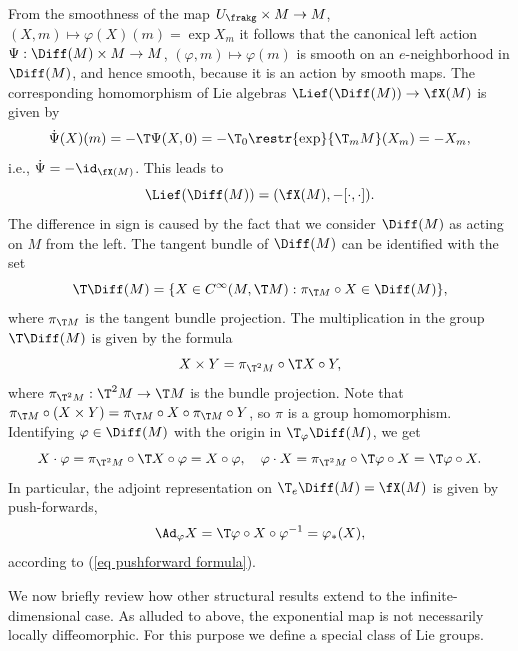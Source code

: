 \begin{example}
    From the smoothness of the map $U_\frakg\times M\to M$, $(X,m)\mapsto \varphi(X)(m)=\exp X_m$ it follows that the canonical left action $\Psi:\Diff(M)\times M\to M$, $(\varphi,m)\mapsto \varphi(m)$ is smooth on an $e$-neighborhood in $\Diff(M)$, and hence smooth, because it is an action by smooth maps. The corresponding homomorphism of Lie algebras $\Lief(\Diff(M))\to \fX(M)$ is given by
    \[\dot\Psi(X)(m)=-\T\Psi (X,0)=-\T_{0}\restr{\exp}{\T_m M}(X_m)=-X_m,\]
    i.e., $\dot\Psi=-\id_{\fX(M)}$. This leads to
    \[\Lief (\Diff(M))=(\fX(M),-[\cdot,\cdot]).\]
    The difference in sign is caused by the fact that we consider $\Diff(M)$ as acting on $M$ from the left. The tangent bundle of $\Diff(M)$ can be identified with the set
    \[\T\Diff(M)=\{X\in C^\infty(M,\T M):\pi_{\T M}\circ X\in \Diff(M)\},\]
    where $\pi_{\T M}$ is the tangent bundle projection. The multiplication in the group $\T\Diff(M)$ is given by the formula
    \[X\times Y=\pi_{\T^2M}\circ \T X\circ Y,\]
    where $\pi_{\T^2M}:\T^2M\to \T M$ is the bundle projection. Note that $\pi_{\T M}\circ (X\times Y)=\pi_{\T M}\circ X\circ \pi_{\T M}\circ Y$, so $\pi$ is a group homomorphism. Identifying $\varphi\in\Diff(M)$ with the origin in $\T_\varphi\Diff(M)$, we get 
    \[X\cdot \varphi=\pi_{\T^2M}\circ \T X\circ \varphi=X\circ \varphi,\quad \varphi\cdot X=\pi_{\T^2M}\circ \T\varphi\circ X=\T\varphi\circ X.\]
    In particular, the adjoint representation on $\T_e\Diff(M)=\fX(M)$ is given by push-forwards,
    \[\Ad_\varphi X=\T\varphi\circ X\circ \varphi^{-1}=\varphi_\ast (X),\]
    according to (\ref{eq pushforward formula}).
\end{example}


We now briefly review how other structural results extend to the infinite-dimensional case. As alluded to above, the exponential map is not necessarily locally diffeomorphic. For this purpose we define a special class of Lie groups.

